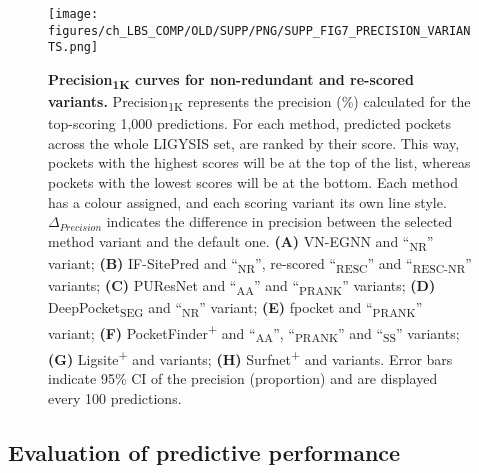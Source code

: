 \begin{figure}[ht!]
    \centering
    \texttt{[image: figures/ch\_LBS\_COMP/OLD/SUPP/PNG/SUPP\_FIG7\_PRECISION\_VARIANTS.png]}
    \caption[Precision\textsubscript{1K} curves for non-redundant and re-scored variants]{\textbf{Precision\textsubscript{1K} curves for non-redundant and re-scored variants.}  Precision\textsubscript{1K} represents the precision (\%) calculated for the top-scoring 1,000 predictions. For each method, predicted pockets across the whole LIGYSIS set, are ranked by their score. This way, pockets with the highest scores will be at the top of the list, whereas pockets with the lowest scores will be at the bottom. Each method has a colour assigned, and each scoring variant its own line style. $\Delta_{Precision}$ indicates the difference in precision between the selected method variant and the default one.  \textbf{(A)} VN-EGNN and ``\textsubscript{NR}'' variant; \textbf{(B)} IF-SitePred and ``\textsubscript{NR}'', re-scored ``\textsubscript{RESC}'' and ``\textsubscript{RESC-NR}'' variants; \textbf{(C)} PUResNet and ``\textsubscript{AA}'' and ``\textsubscript{PRANK}'' variants; \textbf{(D)} DeepPocket\textsubscript{SEG} and ``\textsubscript{NR}'' variant; \textbf{(E)} fpocket and ``\textsubscript{PRANK}'' variant; \textbf{(F)} PocketFinder\textsuperscript{+} and ``\textsubscript{AA}'', ``\textsubscript{PRANK}'' and ``\textsubscript{SS}'' variants; \textbf{(G)} Ligsite\textsuperscript{+} and variants; \textbf{(H)} Surfnet\textsuperscript{+} and variants. Error bars indicate 95\% CI of the precision (proportion) and are displayed every 100 predictions.}
    \label{fig:pocket_precision_variants}
\end{figure}

\FloatBarrier

\subsection{Evaluation of predictive performance}

